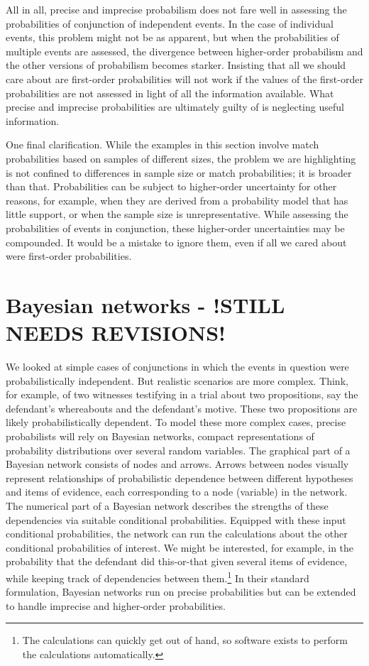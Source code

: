 \documentclass[
  letterpaper,
  DIV=11,
  numbers=noendperiod]{scrartcl}
\begin{document}
All in all, precise and imprecise probabilism does not fare well in
assessing the probabilities of conjunction of independent events. In the
case of individual events, this problem might not be as apparent, but
when the probabilities of multiple events are assessed, the divergence
between higher-order probabilism and the other versions of probabilism
becomes starker. Insisting that all we should care about are first-order
probabilities will not work if the values of the first-order
probabilities are not assessed in light of all the information
available. What precise and imprecise probabilities are ultimately
guilty of is neglecting useful information.

One final clarification. While the examples in this section involve
match probabilities based on samples of different sizes, the problem we
are highlighting is not confined to differences in sample size or match
probabilities; it is broader than that. Probabilities can be subject to
higher-order uncertainty for other reasons, for example, when they are
derived from a probability model that has little support, or when the
sample size is unrepresentative. While assessing the probabilities of
events in conjunction, these higher-order uncertainties may be
compounded. It would be a mistake to ignore them, even if all we cared
about were first-order probabilities.

\section{Bayesian networks - !STILL NEEDS
REVISIONS!}\label{bayesian-networks---still-needs-revisions}

\label{sec:higher-order-networks}

We looked at simple cases of conjunctions in which the events in
question were probabilistically independent. But realistic scenarios are
more complex. Think, for example, of two witnesses testifying in a trial
about two propositions, say the defendant's whereabouts and the
defendant's motive. These two propositions are likely probabilistically
dependent. To model these more complex cases, precise probabilists will
rely on Bayesian networks, compact representations of probability
distributions over several random variables. The graphical part of a
Bayesian network consists of nodes and arrows. Arrows between nodes
visually represent relationships of probabilistic dependence between
different hypotheses and items of evidence, each corresponding to a node
(variable) in the network. The numerical part of a Bayesian network
describes the strengths of these dependencies via suitable conditional
probabilities. Equipped with these input conditional probabilities, the
network can run the calculations about the other conditional
probabilities of interest. We might be interested, for example, in the
probability that the defendant did this-or-that given several items of
evidence, while keeping track of dependencies between them.\footnote{The
  calculations can quickly get out of hand, so software exists to
  perform the calculations automatically.} In their standard
formulation, Bayesian networks run on precise probabilities but can be
extended to handle imprecise and higher-order probabilities.
\end{document}
